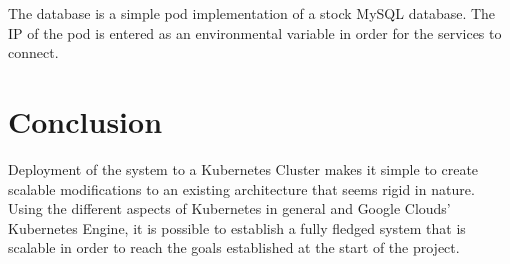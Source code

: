 The database is a simple pod implementation of a stock MySQL database. The IP of the pod is entered as an environmental variable in order for the services to connect. 

\section{Conclusion}

Deployment of the system to a Kubernetes Cluster makes it simple to create scalable modifications to an existing architecture that seems rigid in nature. Using the different aspects of Kubernetes in general and Google Clouds’ Kubernetes Engine, it is possible to establish a fully fledged system that is scalable in order to reach the goals established at the start of the project. 

